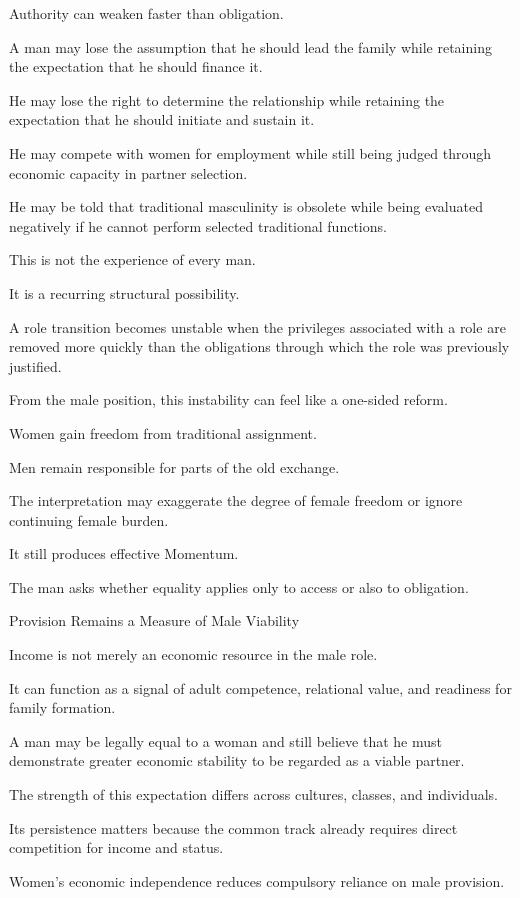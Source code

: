 Authority can weaken faster than obligation.

A man may lose the assumption that he should lead the family while retaining the expectation that he should finance it.

He may lose the right to determine the relationship while retaining the expectation that he should initiate and sustain it.

He may compete with women for employment while still being judged through economic capacity in partner selection.

He may be told that traditional masculinity is obsolete while being evaluated negatively if he cannot perform selected traditional functions.

This is not the experience of every man.

It is a recurring structural possibility.

A role transition becomes unstable when the privileges associated with a role are removed more quickly than the obligations through which the role was previously justified.

From the male position, this instability can feel like a one-sided reform.

Women gain freedom from traditional assignment.

Men remain responsible for parts of the old exchange.

The interpretation may exaggerate the degree of female freedom or ignore continuing female burden.

It still produces effective Momentum.

The man asks whether equality applies only to access or also to obligation.

Provision Remains a Measure of Male Viability

Income is not merely an economic resource in the male role.

It can function as a signal of adult competence, relational value, and readiness for family formation.

A man may be legally equal to a woman and still believe that he must demonstrate greater economic stability to be regarded as a viable partner.

The strength of this expectation differs across cultures, classes, and individuals.

Its persistence matters because the common track already requires direct competition for income and status.

Women’s economic independence reduces compulsory reliance on male provision.

